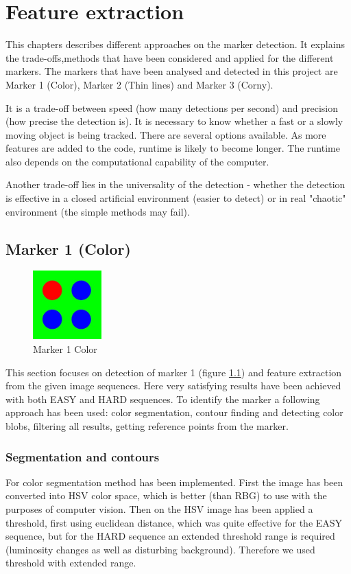 \chapter{Feature extraction} %
\label{chap:feature_extraction}
This chapters describes different approaches on the marker detection. It explains the trade-offs,methods that have been considered and applied for the different markers. The markers that have been analysed and detected in this project are Marker 1 (Color), Marker 2 (Thin lines) and Marker 3 (Corny). 

It is a trade-off between speed (how many detections per second) and precision (how precise the detection is). It is necessary to know whether a fast or a slowly moving object is being tracked. There are several options available. As more features are added to the code, runtime is likely to become longer. The runtime also depends on the computational capability of the computer.

Another trade-off lies in the universality of the detection - whether the detection is effective in a closed artificial environment (easier to detect) or in real "chaotic" environment (the simple methods may fail).

\newpage




\section{Marker 1 (Color)} 

\begin{figure}[ht!]
	\centering
	\includegraphics[width=100px]{figures/Marker1}
	\caption{Marker 1 Color}
	\label{fig:markerColor}
\end{figure}

This section focuses on detection of marker 1 (figure \ref{fig:markerColor}) and feature extraction from the given image sequences.
Here very satisfying results have been achieved with both EASY and HARD sequences. To identify the marker a following approach has been used: color segmentation, contour finding and detecting color blobs, filtering all results, getting reference points from the marker. 

\subsection{Segmentation and contours}
For color segmentation method has been implemented. First the image has been converted into HSV color space, which
is better (than RBG) to use with the purposes of computer vision. Then on the HSV image has been applied a threshold, first
using euclidean  distance, which was quite effective for the EASY sequence, but for the HARD sequence an extended threshold
range is required (luminosity changes as well as disturbing background). Therefore we used threshold with extended range.

